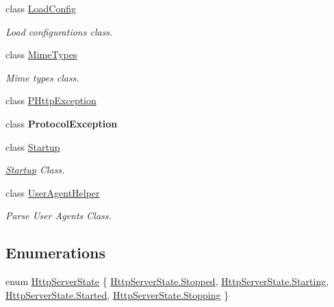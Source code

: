 \begin{DoxyCompactItemize}
\item 
class \hyperlink{class_p_http_1_1_load_config}{Load\+Config}
\begin{DoxyCompactList}\small\item\em Load configurations class. \end{DoxyCompactList}\item 
class \hyperlink{class_p_http_1_1_mime_types}{Mime\+Types}
\begin{DoxyCompactList}\small\item\em Mime types class. \end{DoxyCompactList}\item 
class \hyperlink{class_p_http_1_1_p_http_exception}{P\+Http\+Exception}
\item 
class {\bfseries Protocol\+Exception}
\item 
class \hyperlink{class_p_http_1_1_startup}{Startup}
\begin{DoxyCompactList}\small\item\em \hyperlink{class_p_http_1_1_startup}{Startup} Class. \end{DoxyCompactList}\item 
class \hyperlink{class_p_http_1_1_user_agent_helper}{User\+Agent\+Helper}
\begin{DoxyCompactList}\small\item\em Parse User Agents Class. \end{DoxyCompactList}\end{DoxyCompactItemize}
\subsection*{Enumerations}
\begin{DoxyCompactItemize}
\item 
enum \hyperlink{namespace_p_http_a8a92bffd93830785b58d0be3a2f5fdd4}{Http\+Server\+State} \{ \hyperlink{namespace_p_http_a8a92bffd93830785b58d0be3a2f5fdd4ac23e2b09ebe6bf4cb5e2a9abe85c0be2}{Http\+Server\+State.\+Stopped}, 
\hyperlink{namespace_p_http_a8a92bffd93830785b58d0be3a2f5fdd4ac2efe4bbd13e6cb0db293e72884273c0}{Http\+Server\+State.\+Starting}, 
\hyperlink{namespace_p_http_a8a92bffd93830785b58d0be3a2f5fdd4a8428552d86c0d262a542a528af490afa}{Http\+Server\+State.\+Started}, 
\hyperlink{namespace_p_http_a8a92bffd93830785b58d0be3a2f5fdd4a7b7ecb39b9e110c2a31409a1672bad23}{Http\+Server\+State.\+Stopping}
 \}
\end{DoxyCompactItemize}
